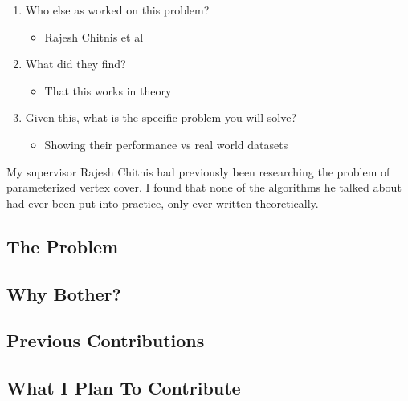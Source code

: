 \begin{enumerate}
\begin{itemize}
    \end{itemize}
    \item Who else as worked on this problem?
    \begin{itemize}
        \item Rajesh Chitnis et al
    \end{itemize}
    \item What did they find?
    \begin{itemize}
        \item That this works in theory
    \end{itemize}
    \item Given this, what is the specific problem you will solve?
    \begin{itemize}
        \item Showing their performance vs real world datasets
    \end{itemize}
\end{enumerate}


My supervisor Rajesh Chitnis had previously been researching the problem of parameterized vertex cover. I found that none of the algorithms he talked about had ever been put into practice, only ever written theoretically.

\subsection{The Problem}
\subsection{Why Bother?}
\subsection{Previous Contributions}
\subsection{What I Plan To Contribute}
